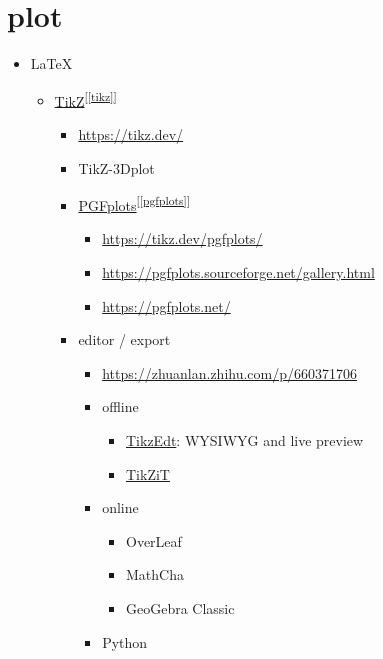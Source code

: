 \documentclass[
]{book}
\providecommand{\tightlist}{%
  \setlength{\itemsep}{0pt}\setlength{\parskip}{0pt}}
\theoremstyle{definition}
\theoremstyle{definition}
\theoremstyle{definition}
\theoremstyle{definition}
\theoremstyle{remark}
\begin{document}
\hypertarget{plot}{%
\chapter{plot}\label{plot}}

\begin{itemize}
\tightlist
\item
  LaTeX

  \begin{itemize}
  \tightlist
  \item
    \protect\hyperlink{tikz}{TikZ}\textsuperscript{{[}\ref{tikz}{]}}

    \begin{itemize}
    \tightlist
    \item
      \url{https://tikz.dev/}
    \item
      TikZ-3Dplot
    \item
      \protect\hyperlink{pgfplots}{PGFplots}\textsuperscript{{[}\ref{pgfplots}{]}}

      \begin{itemize}
      \tightlist
      \item
        \url{https://tikz.dev/pgfplots/}
      \item
        \url{https://pgfplots.sourceforge.net/gallery.html}
      \item
        \url{https://pgfplots.net/}
      \end{itemize}
    \item
      editor / export

      \begin{itemize}
      \tightlist
      \item
        \url{https://zhuanlan.zhihu.com/p/660371706}
      \item
        offline

        \begin{itemize}
        \tightlist
        \item
          \href{http://www.tikzedt.org/}{TikzEdt}: WYSIWYG and live preview
        \item
          \href{https://tikzit.github.io/}{TikZiT}
        \end{itemize}
      \item
        online

        \begin{itemize}
        \tightlist
        \item
          OverLeaf
        \item
          MathCha
        \item
          GeoGebra Classic
        \end{itemize}
      \item
        Python


\end{itemize}
\end{itemize}
\end{itemize}
\end{itemize}
\end{document}
